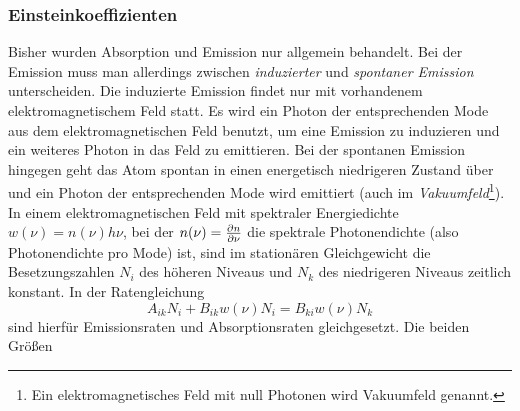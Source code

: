 \subsubsection{Einsteinkoeffizienten}\label{subsubsec:einsteinkoeffizienten}
Bisher wurden Absorption und Emission nur allgemein behandelt. Bei der Emission
muss man allerdings zwischen \textit{induzierter} und \textit{spontaner
Emission} unterscheiden. Die induzierte Emission findet nur mit vorhandenem
elektromagnetischem Feld statt. Es wird ein Photon der entsprechenden Mode aus
dem elektromagnetischen Feld benutzt, um eine Emission zu induzieren und ein
weiteres Photon in das Feld zu emittieren. Bei der spontanen Emission hingegen
geht das Atom spontan in einen energetisch niedrigeren Zustand über und ein
Photon der entsprechenden Mode wird emittiert (auch im
\textit{Vakuumfeld}\footnote{Ein elektromagnetisches Feld mit null Photonen
wird Vakuumfeld genannt.}).
In einem elektromagnetischen Feld mit spektraler Energiedichte $w(\nu)=n(\nu)h\nu$, bei
der $n(\nu)=\frac{\partial n}{\partial \nu}$ die spektrale Photonendichte (also Photonendichte
pro Mode) ist, sind im stationären Gleichgewicht die Besetzungszahlen $N_i$ des
höheren Niveaus und $N_k$ des niedrigeren Niveaus zeitlich konstant. In der Ratengleichung
\begin{equation}\label{eq:raten_gleichung}
	A_{ik}N_i+B_{ik}w(\nu)N_i=B_{ki}w(\nu)N_k
\end{equation}
sind hierfür Emissionsraten und Absorptionsraten gleichgesetzt.
Die beiden Größen

